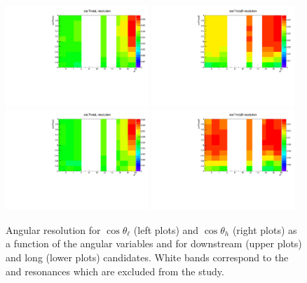 \begin{figure}
\centering
\includegraphics[width=0.48\textwidth]{Lmumu/figs/resolution/resolution2D_cosThetaL_DD.pdf}
\includegraphics[width=0.48\textwidth]{Lmumu/figs/resolution/resolution2D_cosThetaB_DD.pdf} \\
\includegraphics[width=0.48\textwidth]{Lmumu/figs/resolution/resolution2D_cosThetaL_LL.pdf}
\includegraphics[width=0.48\textwidth]{Lmumu/figs/resolution/resolution2D_cosThetaB_LL.pdf}
\caption{Angular resolution for $\cos \theta_\ell$ (left plots) and  $\cos \theta_h$ (right plots)
as a function of the angular variables and \qsq for downstream (upper plots) and
long (lower plots) candidates. White bands correspond to the \jpsi and \psitwos resonances
which are excluded from the study.}
\label{fig:avgResol}
\end{figure}



